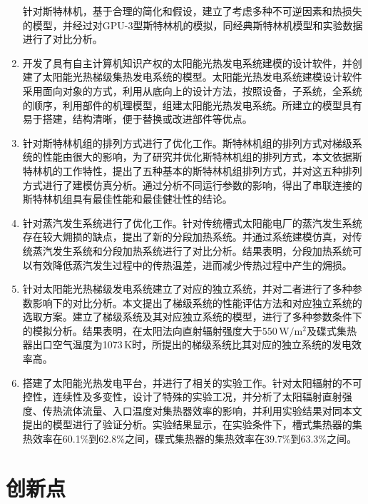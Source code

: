 \begin{enumerate}[label=(\arabic*)]
  针对斯特林机，基于合理的简化和假设，建立了考虑多种不可逆因素和热损失的模型，并经过对GPU-3型斯特林机的模拟，同经典斯特林机模型和实验数据进行了对比分析。
  \item 开发了具有自主计算机知识产权的太阳能光热发电系统建模的设计软件，并创建了太阳能光热梯级集热发电系统的模型。太阳能光热发电系统建模设计软件采用面向对象的方式，利用从底向上的设计方法，按照设备，子系统，全系统的顺序，利用部件的机理模型，组建太阳能光热发电系统。所建立的模型具有易于搭建，结构清晰，便于替换或改进部件等优点。
  \item 针对斯特林机组的排列方式进行了优化工作。斯特林机组的排列方式对梯级系统的性能由很大的影响，为了研究并优化斯特林机组的排列方式，本文依据斯特林机的工作特性，提出了五种基本的斯特林机组排列方式，并对这五种排列方式进行了建模仿真分析。通过分析不同运行参数的影响，得出了串联连接的斯特林机组具有最佳性能和最佳健壮性的结论。
  \item 针对蒸汽发生系统进行了优化工作。针对传统槽式太阳能电厂的蒸汽发生系统存在较大㶲损的缺点，提出了新的分段加热系统。并通过系统建模仿真，对传统蒸汽发生系统和分段加热系统进行了对比分析。结果表明，分段加热系统可以有效降低蒸汽发生过程中的传热温差，进而减少传热过程中产生的㶲损。
  \item 针对太阳能光热梯级发电系统建立了对应的独立系统，并对二者进行了多种参数影响下的对比分析。本文提出了梯级系统的性能评估方法和对应独立系统的选取方案。建立了梯级系统及其对应独立系统的模型，进行了多种参数条件下的模拟分析。结果表明，在太阳法向直射辐射强度大于550\,$\mathrm{W/m^2}$及碟式集热器出口空气温度为1073$\,\mathrm{K}$时，所提出的梯级系统比其对应的独立系统的发电效率高。
	\item 搭建了太阳能光热发电平台，并进行了相关的实验工作。针对太阳辐射的不可控性，连续性及多变性，设计了特殊的实验工况，并分析了太阳辐射直射强度、传热流体流量、入口温度对集热器效率的影响，并利用实验结果对同本文提出的模型进行了验证分析。实验结果显示，在实验条件下，槽式集热器的集热效率在60.1\%到62.8\%之间，碟式集热器的集热效率在39.7\%到63.3\%之间。
\end{enumerate}

\section{创新点}


